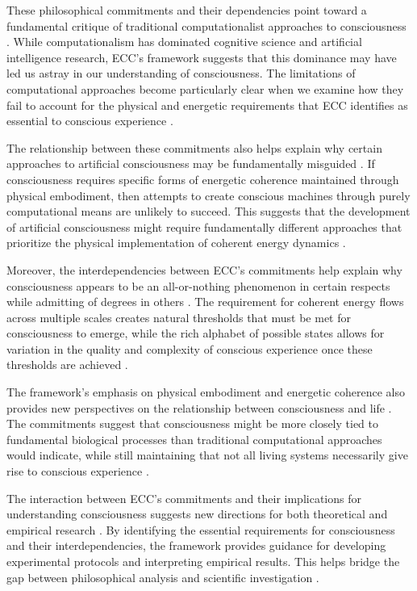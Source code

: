 These philosophical commitments and their dependencies point toward a fundamental critique of traditional computationalist approaches to consciousness \cite{dennett2017from}. While computationalism has dominated cognitive science and artificial intelligence research, ECC's framework suggests that this dominance may have led us astray in our understanding of consciousness. The limitations of computational approaches become particularly clear when we examine how they fail to account for the physical and energetic requirements that ECC identifies as essential to conscious experience \cite{wilson2004boundaries}.

The relationship between these commitments also helps explain why certain approaches to artificial consciousness may be fundamentally misguided \cite{noe2004action}. If consciousness requires specific forms of energetic coherence maintained through physical embodiment, then attempts to create conscious machines through purely computational means are unlikely to succeed. This suggests that the development of artificial consciousness might require fundamentally different approaches that prioritize the physical implementation of coherent energy dynamics \cite{oregan2001sensorimotor}.

Moreover, the interdependencies between ECC's commitments help explain why consciousness appears to be an all-or-nothing phenomenon in certain respects while admitting of degrees in others \cite{hurley1998consciousness}. The requirement for coherent energy flows across multiple scales creates natural thresholds that must be met for consciousness to emerge, while the rich alphabet of possible states allows for variation in the quality and complexity of conscious experience once these thresholds are achieved \cite{gallagher2005how}.

The framework's emphasis on physical embodiment and energetic coherence also provides new perspectives on the relationship between consciousness and life \cite{kirchhoff2019extended}. The commitments suggest that consciousness might be more closely tied to fundamental biological processes than traditional computational approaches would indicate, while still maintaining that not all living systems necessarily give rise to conscious experience \cite{haugeland1993mind}.

The interaction between ECC's commitments and their implications for understanding consciousness suggests new directions for both theoretical and empirical research \cite{wilson2004boundaries}. By identifying the essential requirements for consciousness and their interdependencies, the framework provides guidance for developing experimental protocols and interpreting empirical results. This helps bridge the gap between philosophical analysis and scientific investigation \cite{clark2013whatever}.

